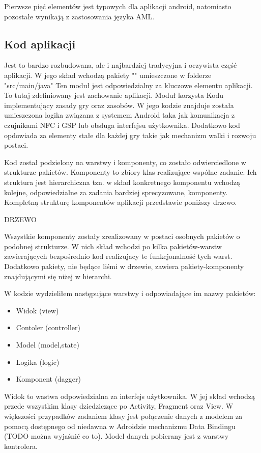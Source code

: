 \documentclass	{xmgr}
\begin{document}
Pierwsze pięć elementów jest typowych dla aplikacji android, natomiasto pozostałe wynikają z zastosowania języka AML.

\subsection{Kod aplikacji} 
Jest to bardzo rozbudowana, ale i najbardziej tradycyjna i oczywista część aplikacji. W jego skład wchodzą pakiety "" umieszczone w folderze "src/main/java"
Ten moduł jest odpowiedzialny za kluczowe elementu aplikacji. To tutaj zdefiniowany jest zachowanie aplikacji. Moduł korzysta Kodu implementujący zasady gry oraz zasobów. W jego kodzie znajduje została umieszczona logika związana z systemem Android taka jak  komunikacja z czujnikami NFC i GSP lub obsługa interfejsu użytkownika. Dodatkowo kod opdowiada za elementy stałe dla każdej gry takie jak mechanizm walki i rozwoju postaci.

Kod został podzielony na warstwy i komponenty, co zostało odwierciedlone w strukturze pakietów. 
Komponenty to zbiory klas realizujące wspólne zadanie. Ich struktura jest hierarchiczna tzn. w skład konkretnego komponentu wchodzą kolejne, odpowiedzialne za zadania bardziej sprecyzowane, komponenty. Kompletną strukturę komponentów aplikacji przedstawie poniższy drzewo.

DRZEWO

Wszystkie komponenty zostały zrealizowany w postaci osobnych pakietów o podobnej strukturze. W nich skład wchodzi po kilka pakietów-warstw zawierających bezpośrednio kod realizujacy te funkcjonalność tych warst. Dodatkowo pakiety, nie będące liśmi w drzewie, zawiera pakiety-komponenty znajdującymi się niżej w hierarchi.

W kodzie wydzieliłem następujące warstwy i odpowiadające im nazwy pakietów:
\begin{itemize}
	\item Widok (view)
	\item Contoler (controller)
	\item Model (model,state)
	\item Logika (logic)
	\item Komponent (dagger)
\end{itemize}

Widok to wastwa odpowiedzialna za interfejs użytkownika. W jej skład wchodzą przede wszystkim klasy dziedziczące po Activity, Fragment oraz View. W większości przypadków zadaniem klasy jest połączenie danych z modelem za pomocą dostępnego od niedawna w Adroidzie mechanizmu Data Bindingu (TODO można wyjaśnić co to). Model danych pobierany jest z warstwy kontrolera.
\end{document}
